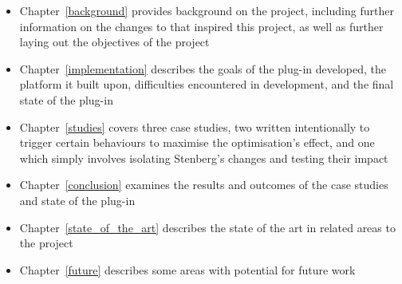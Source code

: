 \begin{itemize}
	\item{Chapter~\ref{background} provides background on the project, including further information on the changes to  that inspired this project, as well as further laying out the objectives of the project}
	\item{Chapter~\ref{implementation} describes the goals of the plug-in developed, the platform it built upon, difficulties encountered in development, and the final state of the plug-in}
	\item{Chapter~\ref{studies} covers three case studies, two written intentionally to trigger certain behaviours to maximise the optimisation's effect, and one which simply involves isolating Stenberg's changes and testing their impact}
	\item{Chapter~\ref{conclusion} examines the results and outcomes of the case studies and state of the plug-in}
	\item{Chapter~\ref{state_of_the_art} describes the state of the art in related areas to the project}
	\item{Chapter~\ref{future} describes some areas with potential for future work}
\end{itemize}
